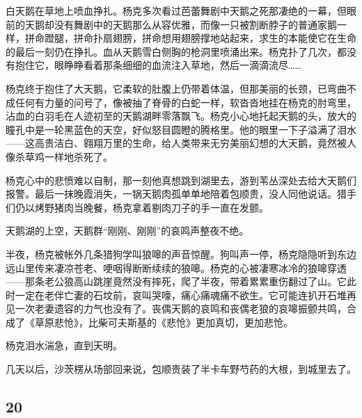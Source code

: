 \par 白天鹅在草地上喷血挣扎。杨克多次看过芭蕾舞剧中天鹅之死那凄绝的一幕，但眼前的天鹅却没有舞剧中的天鹅那么从容优雅，而像一只被割断脖子的普通家鹅一样，拼命蹬腿，拼命扑扇翅膀，拼命想用翅膀撑地站起来，求生的本能使它在生命的最后一刻仍在挣扎。血从天鹅雪白侧胸的枪洞里喷涌出来。杨克扑了几次，都没有抱住它，眼睁睁看着那条细细的血流注入草地，然后一滴滴流尽……
\par 杨克终于抱住了大天鹅，它柔软的肚腹上仍带着体温，但那美丽的长颈，已弯曲不成任何有力量的问号了，像被抽了脊骨的白蛇一样，软沓沓地挂在杨克的肘弯里，沾血的白羽毛在人迹初至的天鹅湖畔零落飘飞。杨克小心地托起天鹅的头，放大的瞳孔中是一轮黑蓝色的天空，好似怒目圆瞪的腾格里。他的眼里一下子溢满了泪水——这高贵洁白、翱翔万里的生命，给人类带来无穷美丽幻想的大天鹅，竟然被人像杀草鸡一样地杀死了。
\par 杨克心中的悲愤难以自制，那一刻他真想跳到湖里去，游到苇丛深处去给大天鹅们报警。最后一抹晚霞消失，一锅天鹅肉孤单单地陪着包顺贵，没人同他说话。猎手们仍以烤野猪肉当晚餐，杨克拿着剔肉刀子的手一直在发颤。
\par 天鹅湖的上空，天鹅群“刚刚、刚刚”的哀鸣声整夜不绝。
\par 
\par 半夜，杨克被帐外几条猎狗学叫狼嗥的声音惊醒。狗叫声一停，杨克隐隐听到东边远山里传来凄凉苍老、哽咽得断断续续的狼嗥。杨克的心被凄寒冰冷的狼嗥穿透——那条老公狼高山跳崖竟然没有摔死，爬了半夜，带着累累重伤翻过了山。它此时一定在老伴亡妻的石坟前，哀叫哭嚎，痛心痛魂痛不欲生。它可能连扒开石堆再见一次老妻遗容的力气也没有了。丧偶天鹅的哀鸣和丧偶老狼的哀嗥振颤共鸣，合成了《草原悲怆》，比柴可夫斯基的《悲怆》更加真切，更加悲怆。
\par 杨克泪水湍急，直到天明。
\par 几天以后，沙茨楞从场部回来说，包顺贵装了半卡车野芍药的大根，到城里去了。
    



\subsection*{20}



